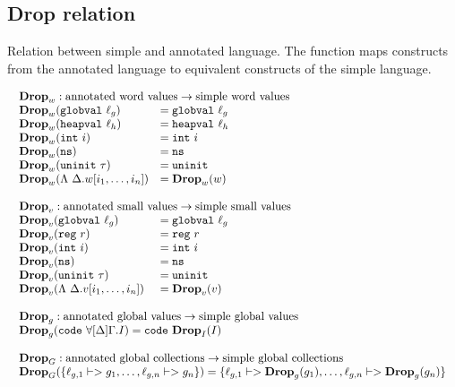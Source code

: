 \subsection{Drop relation}

Relation between simple and annotated language. The function maps constructs
from the annotated language to equivalent constructs of the simple language.

{\footnotesize
\[\begin{array}{l}
\begin{array}{ll}
\rlap{$\mathbf{Drop}_w : \text{annotated word values} -> \text{simple word values}$} \\
\drop{w}{\mathtt{globval}\ \ell_g} &= \mathtt{globval}\ \ell_g \\
\drop{w}{\mathtt{heapval}\ \ell_h} &= \mathtt{heapval}\ \ell_h \\
\drop{w}{\mathtt{int}\ i} &= \mathtt{int}\ i \\
\drop{w}{\mathtt{ns}} &= \mathtt{ns} \\
\drop{w}{\mathtt{uninit}\ \tau} &= \mathtt{uninit} \\
\drop{w}{\Lambda\ \Delta.w[i_1, \dots, i_n]} &= \drop{w}{w} \\\\

\rlap{$\mathbf{Drop}_v : \text{annotated small values} -> \text{simple small values}$} \\
\drop{v}{\mathtt{globval}\ \ell_g} &= \mathtt{globval}\ \ell_g \\
\drop{v}{\mathtt{reg}\ r} &= \mathtt{reg}\ r \\
\drop{v}{\mathtt{int}\ i} &= \mathtt{int}\ i \\
\drop{v}{\mathtt{ns}} &= \mathtt{ns} \\
\drop{v}{\mathtt{uninit}\ \tau} &= \mathtt{uninit} \\
\drop{v}{\Lambda\ \Delta.v[i_1, \dots, i_n]} &= \drop{v}{v}
\end{array} \\\\

\begin{array}{l}
\mathbf{Drop}_g : \text{annotated global values} -> \text{simple global values} \\
\drop{g}{\mathtt{code}\ \forall[\Delta]\Gamma.I} = \mathtt{code}\ \drop{I}{I} \\\\

\mathbf{Drop}_G : \text{annotated global collections} -> \text{simple global collections} \\
\drop{G}{\{\ell_{g,1} |-> g_1, \dots, \ell_{g,n} |-> g_n\}} = \{\ell_{g,1} |-> \drop{g}{g_1}, \dots, \ell_{g,n} |-> \drop{g}{g_n}\} \\\\


\end{array}
\end{array}\]}
